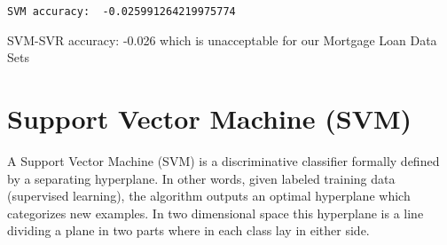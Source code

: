 \documentclass[11pt]{article}
\begin{document}
    \begin{Verbatim}[commandchars=\\\{\}]
SVM accuracy:  -0.025991264219975774

    \end{Verbatim}

    SVM-SVR accuracy: -0.026 which is unacceptable for our Mortgage Loan
Data Sets

    \section{Support Vector Machine (SVM)}\label{support-vector-machine-svm}

A Support Vector Machine (SVM) is a discriminative classifier formally
defined by a separating hyperplane. In other words, given labeled
training data (supervised learning), the algorithm outputs an optimal
hyperplane which categorizes new examples. In two dimensional space this
hyperplane is a line dividing a plane in two parts where in each class
lay in either side.
\end{document}

